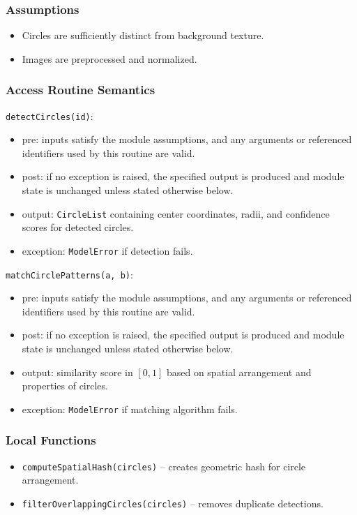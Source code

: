 \documentclass[12pt, titlepage]{article}
\begin{document}
\subsubsection{Assumptions}
\begin{itemize}
    \item Circles are sufficiently distinct from background texture.
    \item Images are preprocessed and normalized.
\end{itemize}

\subsubsection{Access Routine Semantics}

\noindent \texttt{detectCircles(id)}:
\begin{itemize}
    \item pre: inputs satisfy the module assumptions, and any arguments or referenced identifiers used by this routine are valid.
    \item post: if no exception is raised, the specified output is produced and module state is unchanged unless stated otherwise below.
    \item output: \texttt{CircleList} containing center coordinates, radii, and confidence scores for detected circles.
    \item exception: \texttt{ModelError} if detection fails.
\end{itemize}

\noindent \texttt{matchCirclePatterns(a, b)}:
\begin{itemize}
    \item pre: inputs satisfy the module assumptions, and any arguments or referenced identifiers used by this routine are valid.
    \item post: if no exception is raised, the specified output is produced and module state is unchanged unless stated otherwise below.
    \item output: similarity score in \([0, 1]\) based on spatial arrangement and properties of circles.
    \item exception: \texttt{ModelError} if matching algorithm fails.
\end{itemize}

\subsubsection{Local Functions}
\begin{itemize}
    \item \texttt{computeSpatialHash(circles)} – creates geometric hash for circle arrangement.
    \item \texttt{filterOverlappingCircles(circles)} – removes duplicate detections.
\end{itemize}
\end{document}
